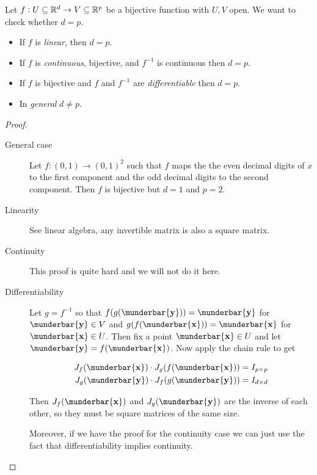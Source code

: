 \documentclass[14pt]{extarticle}
\renewcommand{\vec}[1]{\munderbar{\mathbf{#1}}}
\begin{document}
\begin{proposition}
    Let $f: U \subseteq \mathbb{R}^d \to V \subseteq \mathbb{R}^p$ be a bijective function with $U, V$ open. We want to check whether $d = p$.

    \begin{itemize}
        \item If $f$ is \emph{linear}, then $d = p$.
        \item If $f$ is \emph{continuous}, bijective, and $f^{-1}$ is continuous then $d = p$.
        \item If $f$ is bijective and $f$ and $f^{-1}$ are \emph{differentiable} then $d = p$.
        \item In \emph{general} $d \neq p$.
    \end{itemize}
\end{proposition}

\begin{proof}
    \skiplineafterproof
    \begin{description}
        \item[General case]
            Let $f : (0,1) \to (0,1)^2$ such that $f$ maps the the even decimal digits of $x$ to the first component and the odd decimal digits to the second component.
            Then $f$ is bijective but $d = 1$ and $p = 2$.

        \item[Linearity]
            See linear algebra, any invertible matrix is also a square matrix.

        \item[Continuity]
            This proof is quite hard and we will not do it here.

        \item[Differentiability]
            Let $g = f^{-1}$ so that $f(g(\vec{y})) = \vec{y}$ for $\vec{y} \in V$ and $g(f(\vec{x})) = \vec{x}$ for $\vec{x} \in U$.
            Then fix a point $\vec{x} \in U$ and let $\vec{y} = f(\vec{x})$.
            Now apply the chain rule to get

            \begin{align}
                J_f(\vec{x}) \cdot J_g(f(\vec{x})) & = I_{p\times p} \\
                J_g(\vec{y}) \cdot J_f(g(\vec{y})) & = I_{d\times d}
            \end{align}

            Then $J_f(\vec{x})$ and $J_g(\vec{y})$ are the inverse of each other, so they must be square matrices of the same size.

            Moreover, if we have the proof for the continuity case we can just use the fact that differentiability implies continuity.
    \end{description}
\end{proof}
\end{document}
